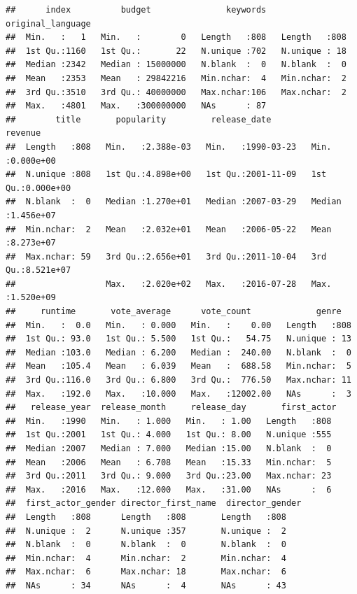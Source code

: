 \documentclass[
]{article}
\begin{document}
\begin{verbatim}
##      index          budget               keywords   original_language
##  Min.   :   1   Min.   :        0   Length   :808   Length   :808    
##  1st Qu.:1160   1st Qu.:       22   N.unique :702   N.unique : 18    
##  Median :2342   Median : 15000000   N.blank  :  0   N.blank  :  0    
##  Mean   :2353   Mean   : 29842216   Min.nchar:  4   Min.nchar:  2    
##  3rd Qu.:3510   3rd Qu.: 40000000   Max.nchar:106   Max.nchar:  2    
##  Max.   :4801   Max.   :300000000   NAs      : 87                    
##        title       popularity         release_date           revenue         
##  Length   :808   Min.   :2.388e-03   Min.   :1990-03-23   Min.   :0.000e+00  
##  N.unique :808   1st Qu.:4.898e+00   1st Qu.:2001-11-09   1st Qu.:0.000e+00  
##  N.blank  :  0   Median :1.270e+01   Median :2007-03-29   Median :1.456e+07  
##  Min.nchar:  2   Mean   :2.032e+01   Mean   :2006-05-22   Mean   :8.273e+07  
##  Max.nchar: 59   3rd Qu.:2.656e+01   3rd Qu.:2011-10-04   3rd Qu.:8.521e+07  
##                  Max.   :2.020e+02   Max.   :2016-07-28   Max.   :1.520e+09  
##     runtime       vote_average      vote_count             genre    
##  Min.   :  0.0   Min.   : 0.000   Min.   :    0.00   Length   :808  
##  1st Qu.: 93.0   1st Qu.: 5.500   1st Qu.:   54.75   N.unique : 13  
##  Median :103.0   Median : 6.200   Median :  240.00   N.blank  :  0  
##  Mean   :105.4   Mean   : 6.039   Mean   :  688.58   Min.nchar:  5  
##  3rd Qu.:116.0   3rd Qu.: 6.800   3rd Qu.:  776.50   Max.nchar: 11  
##  Max.   :192.0   Max.   :10.000   Max.   :12002.00   NAs      :  3  
##   release_year  release_month     release_day       first_actor 
##  Min.   :1990   Min.   : 1.000   Min.   : 1.00   Length   :808  
##  1st Qu.:2001   1st Qu.: 4.000   1st Qu.: 8.00   N.unique :555  
##  Median :2007   Median : 7.000   Median :15.00   N.blank  :  0  
##  Mean   :2006   Mean   : 6.708   Mean   :15.33   Min.nchar:  5  
##  3rd Qu.:2011   3rd Qu.: 9.000   3rd Qu.:23.00   Max.nchar: 23  
##  Max.   :2016   Max.   :12.000   Max.   :31.00   NAs      :  6  
##  first_actor_gender director_first_name  director_gender
##  Length   :808      Length   :808       Length   :808   
##  N.unique :  2      N.unique :357       N.unique :  2   
##  N.blank  :  0      N.blank  :  0       N.blank  :  0   
##  Min.nchar:  4      Min.nchar:  2       Min.nchar:  4   
##  Max.nchar:  6      Max.nchar: 18       Max.nchar:  6   
##  NAs      : 34      NAs      :  4       NAs      : 43
\end{verbatim}
\end{document}
